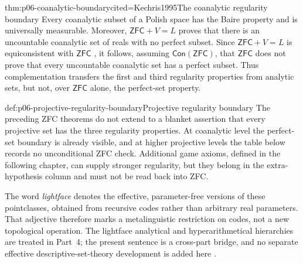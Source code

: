 \begin{hbtheorem}{thm:p06-coanalytic-boundary}{cited=Kechris1995}{The coanalytic regularity boundary}
Every coanalytic subset of a Polish space has the Baire property and is
universally measurable.  Moreover, \(\mathsf{ZFC}+V=L\) proves that there is
an uncountable coanalytic set of reals with no perfect subset.  Since
\(\mathsf{ZFC}+V=L\) is equiconsistent with \(\mathsf{ZFC}\)
\parencite{Godel1938}, it follows, assuming
\(\mathsf{Con}(\mathsf{ZFC})\), that \(\mathsf{ZFC}\) does not prove that every
uncountable coanalytic set has a perfect subset.  Thus complementation transfers
the first and third regularity properties from analytic sets, but not, over
\(\mathsf{ZFC}\) alone, the perfect-set property.
\end{hbtheorem}

\begin{proofboundary}{def:p06-projective-regularity-boundary}{Projective regularity boundary}
The preceding ZFC theorems do not extend to a blanket assertion that every
projective set has the three regularity properties.  At coanalytic level the
perfect-set boundary is already visible, and at higher projective levels the
table below records no unconditional ZFC check.  Additional game axioms,
defined in the following chapter, can supply stronger regularity, but they
belong in the extra-hypothesis column and must not be read back into ZFC.
\end{proofboundary}

The word \emph{lightface} denotes the effective, parameter-free versions of
these pointclasses, obtained from recursive codes rather than arbitrary real
parameters.  That adjective therefore marks a metalinguistic restriction on
codes, not a new topological operation.  The lightface analytical and
hyperarithmetical hierarchies are treated in Part~4; the present sentence is
a cross-part bridge, and no separate effective descriptive-set-theory
development is added here
\cite{Sacks1990,Moschovakis2009}.

